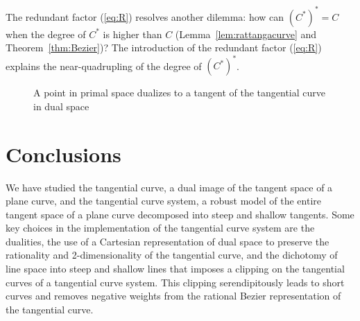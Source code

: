 \documentclass[12pt]{article}
\begin{document}
The redundant factor (\ref{eq:R}) resolves another dilemma:
how can $(C^*)^* = C$ when the degree of $C^*$ is higher than $C$
(Lemma~\ref{lem:rattangacurve} and Theorem~\ref{thm:Bezier})?
The introduction of the redundant factor (\ref{eq:R}) explains the 
near-quadrupling of the degree of $(C^*)^*$.

\begin{figure}[h]
\centerline{}
\caption{A point in primal space dualizes to a tangent of the tangential curve in dual space}
\label{fig:pt2tang}
\end{figure}



\section{Conclusions}
\label{sec:conclude}

We have studied the tangential curve, a dual image of the tangent space of
a plane curve, and the tangential curve system, a robust model of the entire tangent
space of a plane curve decomposed into steep and shallow tangents.
Some key choices in the implementation of the tangential curve system
are the dualities,
the use of a Cartesian representation of dual space to preserve the 
rationality and 2-dimensionality of the tangential curve,
and the dichotomy of line space into steep and shallow lines
that imposes a clipping on the 
tangential curves of a tangential curve system.
This clipping serendipitously leads to short curves 
and removes negative weights from the rational Bezier representation
of the tangential curve.
\end{document}

